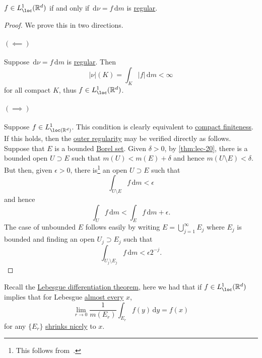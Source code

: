 \begin{lemma}
	\(f \in L^1_{\loc}(\mathbb{R}^d)\) if and only if \(\,\mathrm{d}\nu = f \,\mathrm{d}m\) is \hyperref[def:regular]{regular}.
\end{lemma}
\begin{proof}
	We prove this in two directions.
	\paragraph{\((\impliedby)\)}
	Suppose \(\,\mathrm{d} \nu = f \,\mathrm{d} m\) is \hyperref[def:regular]{regular}. Then
	\[
		\left\vert \nu \right\vert(K) = \int_K \left\vert f \right\vert \,\mathrm{d}m < \infty
	\]
	for all compact \(K\), thus \(f \in L^1_{\loc}(\mathbb{R}^d)\).

	\paragraph{\((\implies)\)}
	Suppose \(f\in L^1_{\loc(\mathbb{R} ^d) }\). This condition is clearly equivalent to \hyperref[def:regular-compact-finite]{compact finiteness}. If this holds, then the \hyperref[def:regular-outer-regularity]{outer regularity} may be verified directly as follows. Suppose that \(E\) is a bounded \hyperref[def:Borel-set]{Borel set}. Given \(\delta > 0\), by \autoref{thm:lec-20}, there is a bounded open \(U \supset E\) such that \(m(U) < m(E)+ \delta \) and hence \(m(U\setminus E)< \delta \). But then, given \(\epsilon >0\), there is\footnote{This follows from~\cite[Corollary 3.6.]{folland1999real}.} an open \(U \supset E\) such that
	\[
		\int _{U\setminus E}f\,\mathrm{d} m < \epsilon
	\]
	and hence
	\[
		\int _U f\,\mathrm{d} m < \int _E f\,\mathrm{d} m + \epsilon.
	\]
	The case of unbounded \(E\) follows easily by writing \(E = \bigcup_{j=1}^{\infty} E_{j}\) where \(E_{j} \) is bounded and finding an open \(U_{j} \supset E_{j} \) such that
	\[
		\int _{U_{j} \setminus E_{j} }f \,\mathrm{d} m < \epsilon 2^{-j}.
	\]
\end{proof}

\begin{prev}
	Recall the \hyperref[thm:Lebesgue-differentiation]{Lebesgue differentiation theorem}, here we had that if \(f \in L^1_{\loc}(\mathbb{R}^d)\) implies that for Lebesgue \hyperref[def:mu-almost-everywhere]{almost every} \(x\),
	\[
		\lim_{r \to 0} \frac{1}{m(E_r)} \int_{E_r} f(y) \,\mathrm{d}y = f(x)
	\]
	for any \(\{E_r\}\) \hyperref[def:shrink-nicely]{shrinks nicely} to \(x\).
\end{prev}

